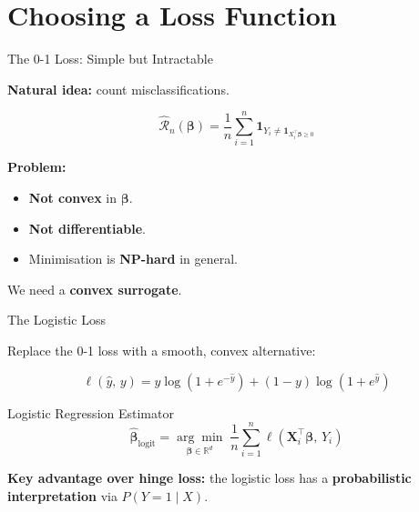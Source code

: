 \documentclass[aspectratio=169, professionalfonts]{beamer}
\def\R{\mathbb{R}}
\begin{document}
\section{Choosing a Loss Function}

\begin{frame}{The 0-1 Loss: Simple but Intractable}

\textbf{Natural idea:} count misclassifications.

$$\hat{\mathcal{R}}_n(\bm{\beta})
  = \frac{1}{n}\sum_{i=1}^{n}
    \mathbf{1}_{Y_i \ne \mathbf{1}_{X_i^\top\bm{\beta}\ge 0}}$$

\bigskip

\textbf{Problem:}
\begin{itemize}
  \item \textbf{Not convex} in $\bm{\beta}$.
  \item \textbf{Not differentiable}.
  \item Minimisation is \textbf{NP-hard} in general.
\end{itemize}

\bigskip

We need a \textbf{convex surrogate}.

\end{frame}

\begin{frame}{The Logistic Loss}

Replace the 0-1 loss with a smooth, convex alternative:

$$\ell(\hat{y},\, y)
  = y\log(1+e^{-\hat{y}}) + (1-y)\log(1+e^{\hat{y}})$$

\bigskip

\begin{block}{Logistic Regression Estimator}
$$\hat{\bm{\beta}}_{\text{logit}}
  = \underset{\bm{\beta}\in\R^d}{\arg\min}\;
    \frac{1}{n}\sum_{i=1}^{n}\ell(\mathbf{X}_i^\top\bm{\beta},\, Y_i)$$
\end{block}

\bigskip

\textbf{Key advantage over hinge loss:} the logistic loss has a
\textbf{probabilistic interpretation} via $P(Y=1\mid X)$.

\end{frame}

\end{document}
